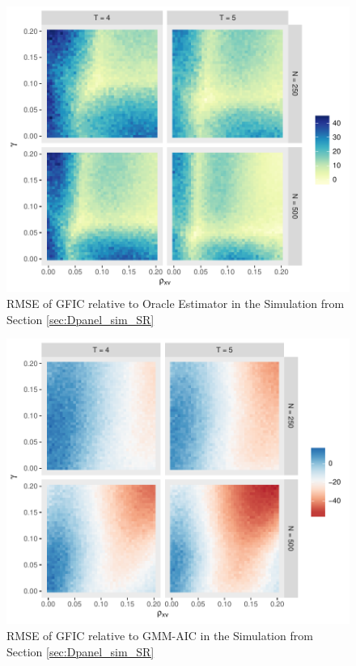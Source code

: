 \begin{figure}
\centering
\includegraphics[scale = 0.8]{./simulations/DynamicPanel/results/Dpanel_GFIC_RMSE_rel_oracle}
\caption{RMSE of GFIC relative to Oracle Estimator in the Simulation from Section \ref{sec:Dpanel_sim_SR}}
\label{fig:RMSE_rel_oracle}
\end{figure}
\begin{figure}
\centering
\includegraphics[scale = 0.8]{./simulations/DynamicPanel/results/Dpanel_GFIC_RMSE_rel_AIC}
\caption{RMSE of GFIC relative to GMM-AIC in the Simulation from Section \ref{sec:Dpanel_sim_SR}}
\end{figure}
